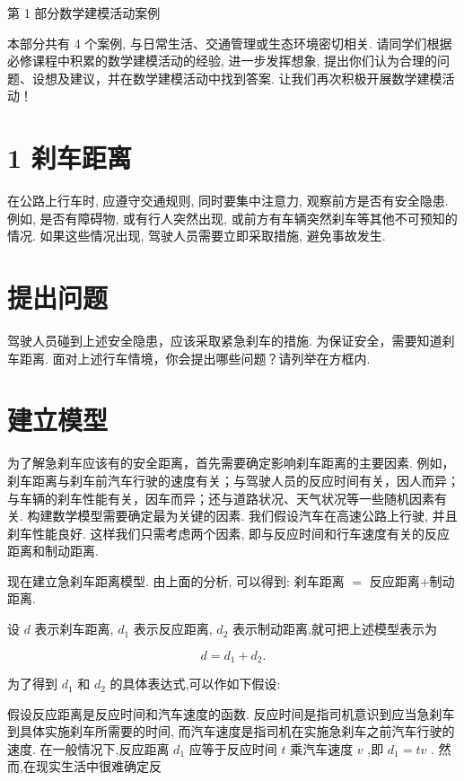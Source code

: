 \documentclass[10pt]{article}
\newcommand*\circled[1]{\tikz[baseline=(char.base)]{\node[shape=circle,draw,inner sep=1.5pt] (char) {\small #1};}}
\begin{document}
第 1 部分数学建模活动案例

本部分共有 4 个案例, 与日常生活、交通管理或生态环境密切相关. 请同学们根据必修课程中积累的数学建模活动的经验, 进一步发挥想象, 提出你们认为合理的问题、设想及建议，并在数学建模活动中找到答案. 让我们再次积极开展数学建模活动！

\section*{}

\section*{1 刹车距离}

在公路上行车时, 应遵守交通规则, 同时要集中注意力, 观察前方是否有安全隐患. 例如, 是否有障碍物, 或有行人突然出现, 或前方有车辆突然刹车等其他不可预知的情况. 如果这些情况出现, 驾驶人员需要立即采取措施, 避免事故发生.

\section*{提出问题}

驾驶人员碰到上述安全隐患，应该采取紧急刹车的措施. 为保证安全，需要知道刹车距离. 面对上述行车情境，你会提出哪些问题？请列举在方框内.

\section*{建立模型}

为了解急刹车应该有的安全距离，首先需要确定影响刹车距离的主要因素. 例如，刹车距离与刹车前汽车行驶的速度有关；与驾驶人员的反应时间有关，因人而异；与车辆的刹车性能有关，因车而异；还与道路状况、天气状况等一些随机因素有关. 构建数学模型需要确定最为关键的因素. 我们假设汽车在高速公路上行驶, 并且刹车性能良好. 这样我们只需考虑两个因素, 即与反应时间和行车速度有关的反应距离和制动距离.

现在建立急刹车距离模型. 由上面的分析, 可以得到: 刹车距离 \(=\) 反应距离+制动距离.

设 \(d\) 表示刹车距离, \({d}_{1}\) 表示反应距离, \({d}_{2}\) 表示制动距离,就可把上述模型表示为

\[
d = {d}_{1} + {d}_{2}.
\]
  \circled{1} 

为了得到 \({d}_{1}\) 和 \({d}_{2}\) 的具体表达式,可以作如下假设:

假设反应距离是反应时间和汽车速度的函数. 反应时间是指司机意识到应当急刹车到具体实施刹车所需要的时间, 而汽车速度是指司机在实施急刹车之前汽车行驶的速度. 在一般情况下,反应距离 \({d}_{1}\) 应等于反应时间 \(t\) 乘汽车速度 \(v\) ,即 \({d}_{1} = {tv}\) . 然而,在现实生活中很难确定反
\end{document}
